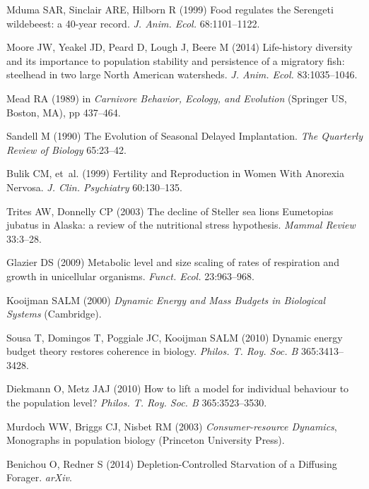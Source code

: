 \documentclass{pnastwo}
\begin{document}
\begin{article}
\begin{thebibliography}{10}
Mduma SAR, Sinclair ARE, Hilborn R
\newblock (1999) {Food regulates the Serengeti wildebeest: a 40-year record}.
\newblock \emph{J. Anim. Ecol.} 68:1101--1122.

Moore JW, Yeakel JD, Peard D, Lough J, Beere M
\newblock (2014) {Life-history diversity and its importance to population
  stability and persistence of a migratory fish: steelhead in two large North
  American watersheds}.
\newblock \emph{J. Anim. Ecol.} 83:1035--1046.

Mead RA
\newblock (1989) in \emph{Carnivore Behavior, Ecology, and Evolution}
\newblock (Springer US, Boston, MA), pp 437--464.

Sandell M
\newblock (1990) {The Evolution of Seasonal Delayed Implantation}.
\newblock \emph{The Quarterly Review of Biology} 65:23--42.

Bulik CM, {et~al.}
\newblock (1999) {Fertility and Reproduction in Women With Anorexia Nervosa}.
\newblock \emph{J. Clin. Psychiatry} 60:130--135.

Trites AW, Donnelly CP
\newblock (2003) {The decline of Steller sea lions Eumetopias jubatus in
  Alaska: a review of the nutritional stress hypothesis}.
\newblock \emph{Mammal Review} 33:3--28.

Glazier DS
\newblock (2009) {Metabolic level and size scaling of rates of respiration and
  growth in unicellular organisms}.
\newblock \emph{Funct. Ecol.} 23:963--968.

Kooijman SALM
\newblock (2000) \emph{{Dynamic Energy and Mass Budgets in Biological Systems}}
\newblock (Cambridge).

Sousa T, Domingos T, Poggiale JC, Kooijman SALM
\newblock (2010) {Dynamic energy budget theory restores coherence in biology}.
\newblock \emph{Philos. T. Roy. Soc. B} 365:3413--3428.

Diekmann O, Metz JAJ
\newblock (2010) {How to lift a model for individual behaviour to the
  population level?}
\newblock \emph{Philos. T. Roy. Soc. B} 365:3523--3530.

Murdoch WW, Briggs CJ, Nisbet RM
\newblock (2003) \emph{{Consumer-resource Dynamics}}, Monographs in population
  biology
\newblock (Princeton University Press).

Benichou O, Redner S
\newblock (2014) {Depletion-Controlled Starvation of a Diffusing Forager}.
\newblock \emph{arXiv}.


\end{thebibliography}
\end{article}
\end{document}
